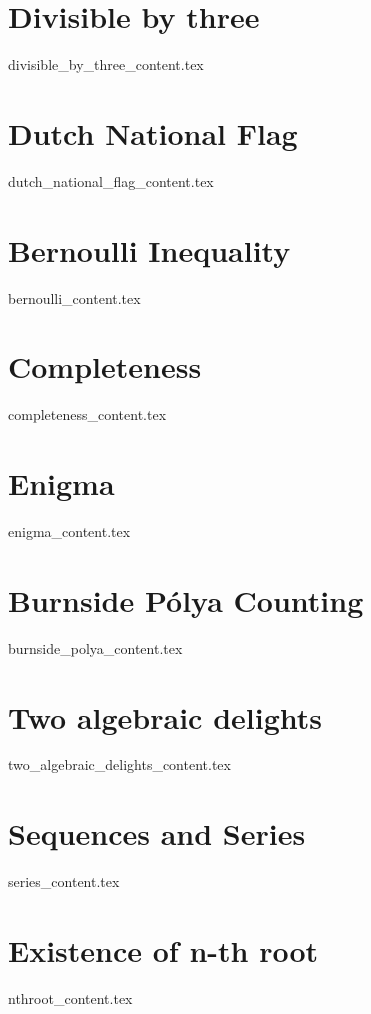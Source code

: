 \documentclass[justified, openany]{tufte-book}
\theoremstyle{plain}%
\theoremstyle{definition}
\theoremstyle{remark}
\begin{document}
\clearpage
\chapter{Divisible by three}
{divisible_by_three_content.tex}

\clearpage
\chapter{Dutch National Flag}
{dutch_national_flag_content.tex}

\clearpage
\chapter{Bernoulli Inequality}
{bernoulli_content.tex}

\clearpage
\chapter{Completeness}
{completeness_content.tex}

\clearpage
\chapter{Enigma}
{enigma_content.tex}

\clearpage
\chapter{Burnside P\'{o}lya Counting}
{burnside_polya_content.tex}

\clearpage
\chapter{Two algebraic delights}
{two_algebraic_delights_content.tex}

\clearpage
\chapter{Sequences and Series}
{series_content.tex}

\clearpage
\chapter{Existence of n-th root}
{nthroot_content.tex}

\begin{fullwidth}


\end{fullwidth}

\printindex

\listoftodos
\end{document}

